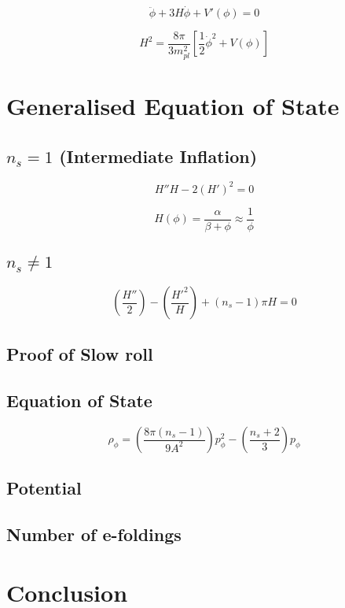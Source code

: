 \documentclass[12pt]{article} %
\begin{document}
\begin{equation}
\ddot{\phi} + 3H\dot{\phi}+V'(\phi)=0
\end{equation}

\begin{equation}
H^{2}=\frac{8\pi}{3 m_{pl}^{2}}[\frac{1}{2}\dot{\phi}^{2}+V(\phi)]
\end{equation}

\section{Generalised Equation of State}

\subsection{$n_{s}=1$ (Intermediate Inflation)}

\begin{equation}
H''H - 2(H')^{2}=0
\end{equation}

\begin{equation}
H(\phi) = \frac{\alpha}{\beta + \phi} \approx \frac{1}{\phi}
\end{equation}

\subsection{$n_{s} \neq 1$}

\begin{equation}
\left( \frac{H''}{2}\right) - \left( \frac{H'^{2}}{H}\right) + \left( n_{s} - 1\right)\pi H = 0
\end{equation}

\subsection{Proof of Slow roll}

\subsection{Equation of State}

\begin{equation}
\rho_{\phi} = \left( \frac{8\pi \left(n_{s}-1\right)}{9 A^{2}}\right)p_{\phi}^{2} - \left(\frac{n_{s}+2}{3}\right)p_{\phi}
\end{equation}

\subsection{Potential}

\subsection{Number of e-foldings}

\section{Conclusion}

{}

\end{document}
